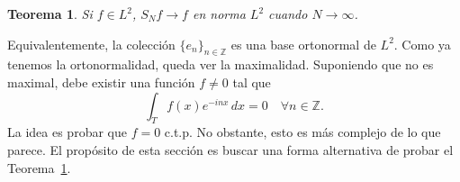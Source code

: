 \documentclass{article}
\newtheorem{Teorema}{Teorema}
\theoremstyle{plain}
\theoremstyle{definition}
\newcommand{\Z}{\mathbb{Z}}
\begin{document}
\begin{Teorema}\label{main:thm}
  Si \(f\in L^2\), \(S_N f \to f\) en norma \(L^2\) cuando \(N\to \infty\).  
\end{Teorema}

Equivalentemente, la colección \(\lbrace e_n \rbrace_{n\in\Z}\) es una base ortonormal de \(L^2\).
Como ya tenemos la ortonormalidad, queda ver la maximalidad. Suponiendo que no es maximal, 
debe existir una función \(f \ne 0\) tal que
\begin{displaymath}
  \int_{T} f(x) e^{-inx} \,dx = 0 \quad\forall n\in \Z.
\end{displaymath}
La idea es probar que \(f = 0\) c.t.p. No obstante, esto es más complejo de lo que parece. 
El propósito de esta sección es buscar una forma alternativa de probar el Teorema~\ref{main:thm}.
\end{document}
